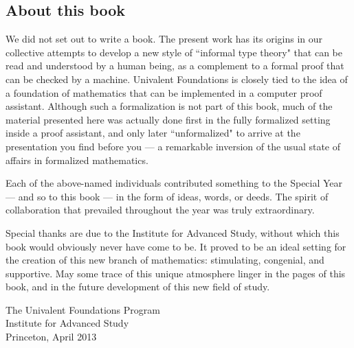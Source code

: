 \subsection*{About this book}

We did not set out to write a book. The present work has its origins in our collective attempts to develop a new style of ``informal type theory" that can be read and understood by a human being, as a complement to a formal proof that can be checked by a machine.  
Univalent Foundations is closely tied to the idea of a foundation of mathematics that can be implemented in a computer proof assistant.  Although such a formalization is not part of this book, much of the material presented here was actually done first in the fully formalized setting inside a proof assistant, and only later ``unformalized" to arrive at the presentation you find before you --- a remarkable inversion of the usual state of affairs in formalized mathematics.  

Each of the above-named individuals contributed something to the Special Year --- and so to this book --- in the form of ideas, words, or deeds.  The spirit of collaboration that prevailed throughout the year was truly extraordinary. 

\mentalpause

Special thanks are due to the Institute for Advanced Study, without which this book would obviously never have come to be.  It proved  to be an ideal setting for the creation of this new branch of mathematics: stimulating, congenial, and supportive.  May some trace of this unique atmosphere linger in the pages of this book, and in the future development of this new field of study.

\bigskip

\begin{flushright}
The Univalent Foundations Program\\
Institute for Advanced Study\\
Princeton, April 2013
\end{flushright}

